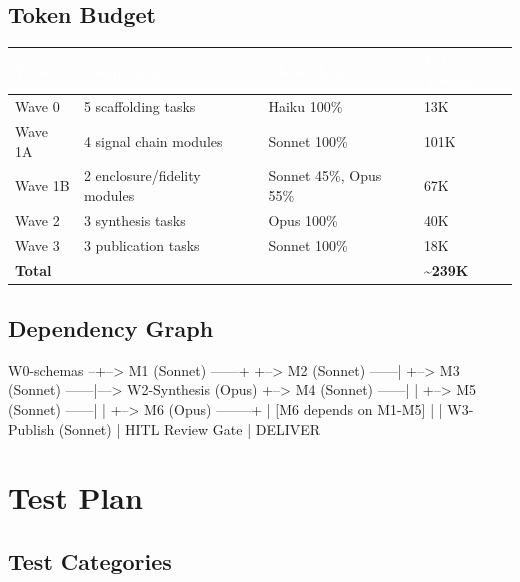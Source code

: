 \documentclass[11pt,letterpaper]{article}
\newcommand{\tableheader}[1]{\textbf{\sffamily\textcolor{white}{#1}}}
\begin{document}
\subsection{Token Budget}

\begin{center}
\begin{tabularx}{\textwidth}{L{3cm}XC{2cm}C{2cm}}
\toprule
{}
\tableheader{Wave} & \tableheader{Components} & \tableheader{Model Mix} & \tableheader{Est. Tokens} \\
\midrule
Wave 0 & 5 scaffolding tasks & Haiku 100\% & 13K \\
Wave 1A & 4 signal chain modules & Sonnet 100\% & 101K \\
Wave 1B & 2 enclosure/fidelity modules & Sonnet 45\%, Opus 55\% & 67K \\
Wave 2 & 3 synthesis tasks & Opus 100\% & 40K \\
Wave 3 & 3 publication tasks & Sonnet 100\% & 18K \\
\midrule
\textbf{Total} & & & \textbf{\textasciitilde239K} \\
\bottomrule
\end{tabularx}
\end{center}

\subsection{Dependency Graph}

\begin{asciibox}
W0-schemas --+--> M1 (Sonnet) ------+
             +--> M2 (Sonnet) ------|
             +--> M3 (Sonnet) ------|---> W2-Synthesis (Opus)
             +--> M4 (Sonnet) ------|         |
             +--> M5 (Sonnet) ------|         |
             +--> M6 (Opus) --------+         |
                  [M6 depends on M1-M5]        |
                                               |
                                          W3-Publish (Sonnet)
                                               |
                                          HITL Review Gate
                                               |
                                          DELIVER
\end{asciibox}

\section{Test Plan}

\subsection{Test Categories}
\end{document}

